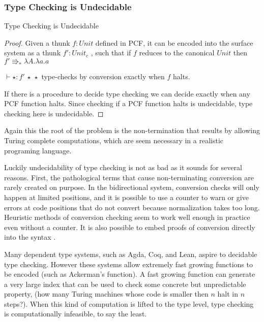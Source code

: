 \subsubsection{Type Checking is Undecidable}
\begin{thm}
Type Checking is Undecidable
\end{thm}

\begin{proof}
Given a thunk $f:Unit$ defined in PCF, it can be encoded into the
surface system as a thunk $f':Unit_{c}$ , such that if $f$ reduces
to the canonical $Unit$ then $f'\Rrightarrow_{\ast}\lambda A.\lambda a.a$ 

$\vdash\star:f'\,\star\,\star$ type-checks by conversion exactly
when $f$ halts.

If there is a procedure to decide type checking we can decide exactly
when any PCF function halts. Since checking if a PCF function halts
is undecidable, type checking here is undecidable.
\end{proof}
Again this the root of the problem is the non-termination that results
by allowing Turing complete computations, which are seem necessary
in a realistic programing language.

Luckily undecidability of type checking is not as bad as it sounds
for several reasons. First, the pathological terms that cause non-terminating
conversion are rarely created on purpose. In the bidirectional system,
conversion checks will only happen at limited positions, and it is
possible to use a counter to warn or give errors at code positions
that do not convert because normalization takes too long. Heuristic
methods of conversion checking seem to work well enough in practice
even without a counter. It is also possible to embed proofs of conversion
directly into the syntax \cite{sjoberg2012irrelevance}.

Many dependent type systems, such as Agda, Coq, and Lean, aspire to
decidable type checking. However these systems allow extremely fast
growing functions to be encoded (such as Ackerman's function). A fast
growing function can generate a very large index that can be used
to check some concrete but unpredictable property, (how many Turing
machines whose code is smaller then $n$ halt in $n$ steps?). When
this kind of computation is lifted to the type level, type checking
is computationally infeasible, to say the least.


